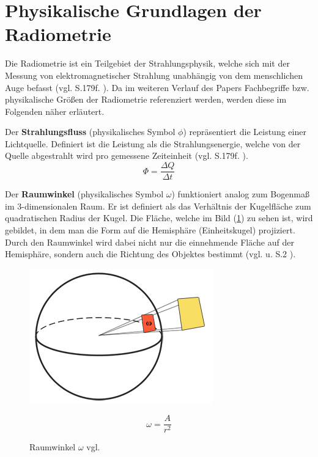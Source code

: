 \documentclass[
  11pt,
  a4paper,
  oneside
  ]{article}
\begin{document}
\section{Physikalische Grundlagen der Radiometrie}\label{sec:radiometrie}
Die Radiometrie ist ein Teilgebiet der Strahlungsphysik, welche sich mit der Messung von elektromagnetischer Strahlung unabhängig von dem menschlichen Auge befasst 
(vgl. S.179f. \cite{Beyerer2016}). Da im weiteren Verlauf des Papers Fachbegriffe bzw. physikalische Größen der Radiometrie referenziert werden, werden diese im Folgenden näher erläutert. 

Der \textbf{Strahlungsfluss} (physikalisches Symbol $\phi$) repräsentiert die Leistung einer Lichtquelle. Definiert ist die Leistung als die Strahlungsenergie, welche von der Quelle abgestrahlt wird pro gemessene Zeiteinheit (vgl. S.179f. \cite{Beyerer2016}). 
\begin{equation}
  \Phi =\dfrac{\Delta Q}{\Delta t}
\end{equation}

Der \textbf{Raumwinkel} (physikalisches Symbol $\omega$) funktioniert analog zum Bogenmaß im 3-dimensionalen Raum. Er ist definiert als das Verhältnis der Kugelfläche zum quadratischen Radius der Kugel. Die Fläche, welche im Bild
(\ref{fig:img6}) zu sehen ist, wird gebildet, in dem man die Form auf die Hemisphäre (Einheitskugel) projiziert. Durch den Raumwinkel wird dabei nicht nur die einnehmende Fläche auf der Hemisphäre, sondern auch die Richtung des Objektes bestimmt 
(vgl. \cite{learnOpenGL} u. S.2 \cite{irrlichtOrg}). 
\begin{figure}[H]
  \centering
  \begin{minipage}{.5\textwidth}
    \centering
    \includegraphics*[width=0.8\linewidth]{images/solid_angle.png}
    \caption{Raumwinkel $\omega$ vgl. \cite{learnOpenGL}}
    \label{fig:img6}
  \end{minipage}%
  \hfill
  \begin{minipage}{.5\textwidth}
    \begin{equation}
      \omega =\dfrac{A}{r^{2}}
    \end{equation}
  \end{minipage}
\end{figure}
\end{document}
